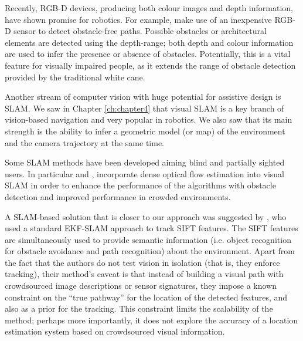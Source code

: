 Recently, RGB-D devices, producing both colour images and depth information, have shown promise for robotics. For example, \citet{aladren2014navigation} make use of an inexpensive RGB-D sensor to detect obstacle-free paths. Possible obstacles or architectural elements are detected using the depth-range; both depth and colour information are used to infer the presence or absence of obstacles. Potentially, this is a vital feature for visually impaired people, as it extends the range of obstacle detection provided by the traditional white cane.


Another stream of computer vision with huge potential for assistive design is SLAM. We saw in Chapter \ref{ch:chapter4} that visual SLAM is a key branch of vision-based navigation and very popular in robotics. We also saw that its main strength is the ability to infer a geometric model (or map) of the environment and the camera trajectory at the same time. 

Some SLAM methods have been developed aiming blind and partially sighted users. In particular \cite{alcantarilla2010visual} and \cite{alcantarilla2012combining}, incorporate dense optical flow estimation into visual SLAM in order to enhance the performance of the algorithms with obstacle detection and improved performance in crowded environments.



A SLAM-based solution that is closer to our approach was suggested by \citet{ali2010indoor}, who used a standard EKF-SLAM approach to track SIFT features. The SIFT features are simultaneously used to provide semantic information (i.e. object recognition for obstacle avoidance and path recognition) about the environment. Apart from the fact that the authors do not test vision in isolation (that is, they enforce tracking), their method's caveat is that instead of building a visual path with crowdsourced image descriptions or sensor signatures, they impose a known constraint on the ``true pathway'' for the location of the detected features, and also as a prior for the tracking. This constraint limits the scalability of the method; perhaps more importantly, it does not explore the accuracy of a location estimation system based on crowdsourced visual information.

